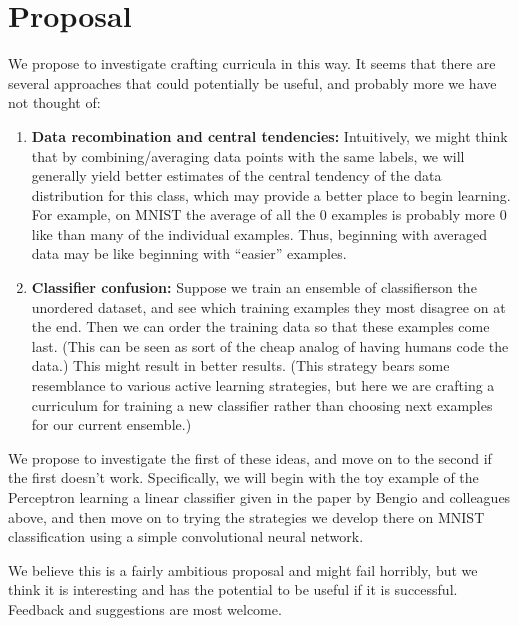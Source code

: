 \documentclass[11pt]{article}
\begin{document}
\section{Proposal}
We propose to investigate crafting curricula in this way. It seems that there are several approaches that could potentially be useful, and probably more we have not thought of: 
\begin{enumerate}
\item \textbf{Data recombination and central tendencies:} Intuitively, we might think that by combining/averaging data points with the same labels, we will generally yield better estimates of the central tendency of the data distribution for this class, which may provide a better place to begin learning. For example, on MNIST the average of all the 0 examples is probably more 0 like than many of the individual examples. Thus, beginning with averaged data may be like beginning with ``easier'' examples. 
\item \textbf{Classifier confusion:} Suppose we train an ensemble of classifierson the unordered dataset, and see which training examples they most disagree on at the end. Then we can order the training data so that these examples come last. (This can be seen as sort of the cheap analog of having humans code the data.) This might result in better results. (This strategy bears some resemblance to various active learning strategies, but here we are crafting a curriculum for training a new classifier rather than choosing next examples for our current ensemble.)
\end{enumerate}
We propose to investigate the first of these ideas, and move on to the second if the first doesn't work. Specifically, we will begin with the toy example of the Perceptron learning a linear classifier given in the paper by Bengio and colleagues above, and then move on to trying the strategies we develop there on MNIST classification using a simple convolutional neural network.\par
We believe this is a fairly ambitious proposal and might fail horribly, but we think it is interesting and has the potential to be useful if it is successful. Feedback and suggestions are most welcome.
\end{document}
